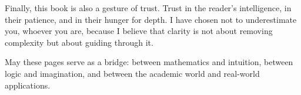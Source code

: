 Finally, this book is also a gesture of trust. Trust in the reader's intelligence, in their patience, and in their hunger for depth. I have chosen not to underestimate you, whoever you are, because I believe that clarity is not about removing complexity but about guiding through it.

May these pages serve as a bridge: between mathematics and intuition, between logic and imagination, and between the academic world and real-world applications.
